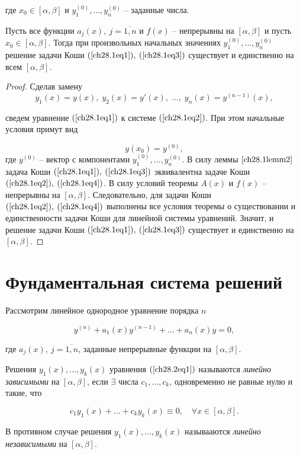 где $x_0 \in [\alpha, \beta]$ и $y_1^{(0)}, \ldots, y_n^{(0)}$ -- заданные числа.

\begin{thm}
Пусть все функции $a_j(x), \: j = \overline{1,n}$ и $f(x)$ -- непрерывны на $[\alpha, \beta]$ и пусть $x_0 \in [\alpha, \beta]$. Тогда при произвольных начальных значениях $y_1^{(0)}, \ldots, y_n^{(0)}$ решение задачи Коши $(\ref{ch28.1eq1}), \: (\ref{ch28.1eq3})$ существует и единственно на всем $[\alpha, \beta]$.
\end{thm}

\begin{proof}
Сделав замену 
$$
y_1(x) = y(x), \; y_2(x) = y'(x), \; \ldots, \; y_n(x) = y^{(n - 1)}(x),
$$

сведем уравнение $(\ref{ch28.1eq1})$ к системе $(\ref{ch28.1eq2})$. При этом начальные условия примут вид

\begin{equation} \label{ch28.1eq4}
y(x_0) = y^{(0)},
\end{equation}
где $y^{(0)}$ -- вектор с компонентами $y_1^{(0)}, \ldots, y_n^{(0)}$. В силу леммы $\ref{ch28.1lemm2}$ задача Коши $(\ref{ch28.1eq1}), \: (\ref{ch28.1eq3})$ эквивалентна задаче Коши $(\ref{ch28.1eq2}), \: (\ref{ch28.1eq4})$. В силу условий теоремы $A(x)$ и $f(x)$ -- непрерывны на $[\alpha, \beta]$. Следовательно, для задачи Коши $(\ref{ch28.1eq2}), \: (\ref{ch28.1eq4})$ выполнены все условия теоремы о существовании и единственности задачи Коши для линейной системы уравнений. Значит, и решение задачи Коши $(\ref{ch28.1eq1}), \: (\ref{ch28.1eq3})$ существует и единственно на $[\alpha, \beta]$.
\end{proof}
\section{Фундаментальная система решений}

Рассмотрим линейное однородное уравнение порядка $n$

\begin{equation} \label{ch28.2eq1}
y^{(n)} + a_1(x)y^{(n - 1)} + \ldots + a_n(x)y = 0,
\end{equation} 

где $a_j(x), \: j = \overline{1,n}$, заданные непрерывные функции на $[\alpha, \beta]$.

\begin{defn}
Решения $y_1(x), \ldots, y_k(x)$ уравнения $(\ref{ch28.2eq1})$ называются \textit{линейно зависимыми} на $[\alpha, \beta]$, если $\exists$ числа $c_1, \ldots, c_k$, одновременно не равные нулю и такие, что 

$$
c_1y_1(x) + \ldots + c_ky_k(x) \equiv 0, \quad \forall x \in [\alpha, \beta].
$$

В противном случае решения $y_1(x), \ldots, y_k(x)$ называаются \textit{линейно независимыми} на $[\alpha, \beta]$.
\end{defn}

